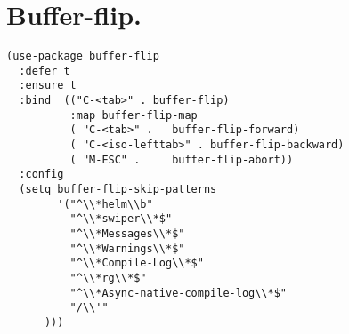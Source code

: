 \documentclass[11pt]{article}
\begin{document}
\section{Buffer-flip.}
\label{sec:orgf1ce475}
\begin{verbatim}
(use-package buffer-flip
  :defer t
  :ensure t
  :bind  (("C-<tab>" . buffer-flip)
          :map buffer-flip-map
          ( "C-<tab>" .   buffer-flip-forward) 
          ( "C-<iso-lefttab>" . buffer-flip-backward) 
          ( "M-ESC" .     buffer-flip-abort))
  :config
  (setq buffer-flip-skip-patterns
        '("^\\*helm\\b"
          "^\\*swiper\\*$"
          "^\\*Messages\\*$"
          "^\\*Warnings\\*$"
          "^\\*Compile-Log\\*$"
          "^\\*rg\\*$"
          "^\\*Async-native-compile-log\\*$"
          "/\\'"
      )))
\end{verbatim}
\end{document}
